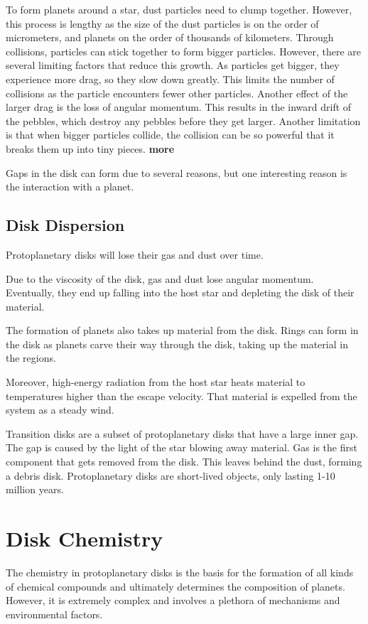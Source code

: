 \documentclass[oneside, single, authoryear, semicolon, 12pt]{lion-msc}
\newcommand{\4}{$_4$}
\newcommand{\3}{$_3$}
\newcommand{\2}{$_2$}
\begin{document}
To form planets around a star, dust particles need to clump together. However, this process is lengthy as the size of the dust particles is on the order of micrometers, and planets on the order of thousands of kilometers. Through collisions, particles can stick together to form bigger particles. However, there are several limiting factors that reduce this growth. As particles get bigger, they experience more drag, so they slow down greatly. This limits the number of collisions as the particle encounters fewer other particles. Another effect of the larger drag is the loss of angular momentum. This results in the inward drift of the pebbles, which destroy any pebbles before they get larger. Another limitation is that when bigger particles collide, the collision can be so powerful that it breaks them up into tiny pieces. 
\textbf{more}

Gaps in the disk can form due to several reasons, but one interesting reason is the interaction with a planet.

\subsection{Disk Dispersion}
Protoplanetary disks will lose their gas and dust over time.

Due to the viscosity of the disk, gas and dust lose angular momentum. Eventually, they end up falling into the host star and depleting the disk of their material. 

The formation of planets also takes up material from the disk. Rings can form in the disk as planets carve their way through the disk, taking up the material in the regions.

Moreover, high-energy radiation from the host star heats material to temperatures higher than the escape velocity. That material is expelled from the system as a steady wind. 

Transition disks are a subset of protoplanetary disks that have a large inner gap. The gap is caused by the light of the star blowing away material. Gas is the first component that gets removed from the disk. This leaves behind the dust, forming a debris disk. Protoplanetary disks are short-lived objects, only lasting 1-10 million years. 


\section{Disk Chemistry}
The chemistry in protoplanetary disks is the basis for the formation of all kinds of chemical compounds and ultimately determines the composition of planets.  However, it is extremely complex and involves a plethora of mechanisms and environmental factors. 
\end{document}
